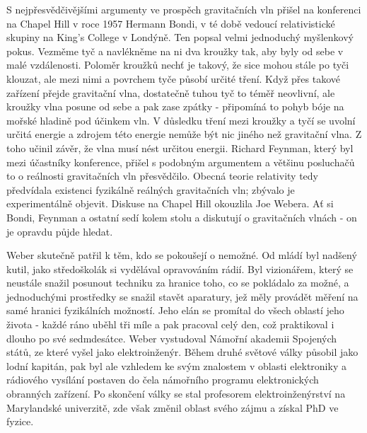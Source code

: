   S nejpřesvědčivějšími argumenty ve prospěch gravitačních vln přišel na konferenci na Chapel Hill v
  roce 1957 Hermann Bondi, v té době vedoucí relativistické skupiny na King’s College v Londýně. Ten
  popsal velmi jednoduchý myšlenkový pokus. Vezměme tyč a navlékněme na ni dva kroužky tak, aby byly
  od sebe v malé vzdálenosti. Poloměr kroužků nechť je takový, že sice mohou stále po tyči klouzat,
  ale mezi nimi a povrchem tyče působí určité tření. Když přes takové zařízení přejde gravitační
  vlna, dostatečně tuhou tyč to téměř neovlivní, ale kroužky vlna posune od sebe a pak zase zpátky -
  připomíná to pohyb bóje na mořské hladině pod účinkem vln. V důsledku tření mezi kroužky a tyčí se
  uvolní určitá energie a zdrojem této energie nemůže být nic jiného než gravitační vlna. Z toho
  učinil závěr, že vlna musí nést určitou energii. Richard Feynman, který byl mezi účastníky
  konference, přišel s podobným argumentem a většinu posluchačů to o reálnosti gravitačních vln
  přesvědčilo. Obecná teorie relativity tedy předvídala existenci fyzikálně reálných gravitačních
  vln; zbývalo je experimentálně objevit. Diskuse na Chapel Hill okouzlila Joe Webera. Ať si Bondi,
  Feynman a ostatní sedí kolem stolu a diskutují o gravitačních vlnách - on je opravdu půjde hledat.

  Weber skutečně patřil k těm, kdo se pokoušejí o nemožné. Od mládí byl nadšený kutil, jako
  středoškolák si vydělával opravováním rádií. Byl vizionářem, který se neustále snažil posunout
  techniku za hranice toho, co se pokládalo za možné, a jednoduchými prostředky se snažil stavět
  aparatury, jež měly provádět měření na samé hranici fyzikálních možností. Jeho elán se promítal do
  všech oblastí jeho života - každé ráno uběhl tři míle a pak pracoval celý den, což praktikoval i
  dlouho po své sedmdesátce. Weber vystudoval Námořní akademii Spojených států, ze které vyšel jako
  elektroinženýr. Během druhé světové války působil jako lodní kapitán, pak byl ale vzhledem ke svým
  znalostem v oblasti elektroniky a rádiového vysílání postaven do čela námořního programu
  elektronických obranných zařízení. Po skončení války se stal profesorem elektroinženýrství na
  Marylandské univerzitě, zde však změnil oblast svého zájmu a získal PhD ve fyzice. 

